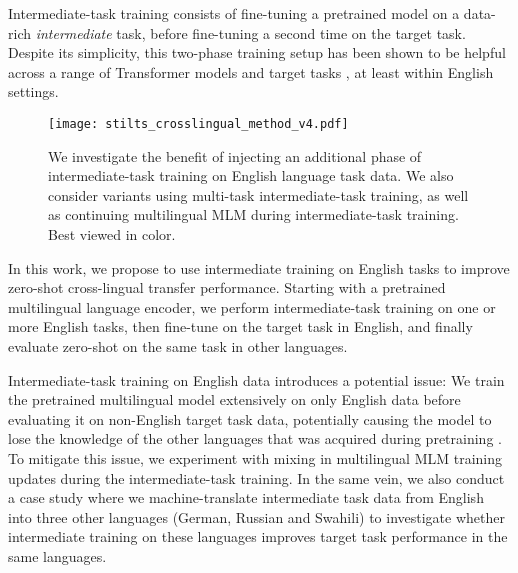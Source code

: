 \documentclass[11pt,a4paper]{article}
\begin{document}
Intermediate-task training \citep[STILTs;][]{Phang2018SentenceEO} consists of fine-tuning a pretrained model on a data-rich \textit{intermediate} task, 
before fine-tuning a second time on the target task. Despite its simplicity, this two-phase training setup has been shown to be helpful across a range of Transformer models and target tasks \citep{wang2019sesame,pruksachatkun2020intermediate}, at least within English settings.


\begin{figure*}
    \centering
    \texttt{[image: stilts\_crosslingual\_method\_v4.pdf]}
    \caption{We investigate the benefit of injecting an additional phase of intermediate-task training on English language task data. We also consider variants using multi-task intermediate-task training, as well as continuing multilingual MLM during intermediate-task training. Best viewed in color.}
    \label{fig:crosslingual_stilts_method}
\end{figure*}


In this work, we propose to use intermediate training on English tasks to improve zero-shot cross-lingual transfer performance. Starting with a pretrained multilingual language encoder, we perform intermediate-task training on one or more English tasks, then fine-tune on the target task in English, and finally evaluate zero-shot on the same task in other languages. 

Intermediate-task training on English data introduces a potential issue: We train the pretrained multilingual model extensively on only English data before evaluating it on non-English target task data, potentially causing the model to lose the knowledge of the other languages that was acquired during pretraining \citep{Kirkpatrick2017,yogatama2019learning}. To mitigate this issue, we experiment with mixing in multilingual MLM training updates during the intermediate-task training.
In the same vein, we also conduct a case study where we machine-translate intermediate task data from English into three other languages (German, Russian and Swahili) to investigate whether intermediate training on these languages improves target task performance in the same languages.
\end{document}
